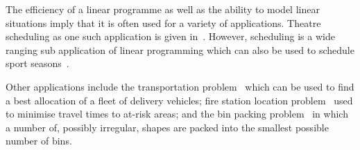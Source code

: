 The efficiency of a linear programme as well as the ability to model
linear situations imply that it is often used for a variety of applications.
Theatre scheduling as one such application is given
in~\parencite{guerriero2011operational}.
However, scheduling is a wide ranging sub application of linear programming
which can also be used to schedule sport
seasons~\parencite{duran2007scheduling}.

Other applications include the transportation problem~\parencite{diaz2014survey}
which can be used to find a best allocation of a fleet of delivery vehicles;
fire station location problem~\parencite{schreuder1981application} used to
minimise travel times to at-risk areas; and the bin packing
problem~\parencite{hifi2010linear} in which a number of, possibly irregular,
shapes are packed into the smallest possible number of bins.
